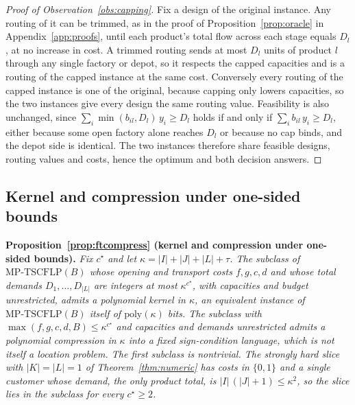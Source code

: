 \begin{proof}[Proof of Observation~\ref{obs:capping}]
Fix a design of
the original instance. Any routing of it can be trimmed, as in
the proof of Proposition~\ref{prop:oracle} in Appendix~\ref{app:proofs}, until each product's total
flow across each stage equals $D_l$, at no increase in cost. A
trimmed routing sends at most $D_l$ units of product $l$ through any
single factory or depot, so it respects the capped capacities and is a
routing of the capped instance at the same cost. Conversely every
routing of the capped instance is one of the original, because capping
only lowers capacities, so the two instances give every design the same
routing value. Feasibility is also unchanged, since
$\sum_i\min(b_{il},D_l)\,y_i\ge D_l$ holds if and only if
$\sum_i b_{il}\,y_i\ge D_l$, either because some open factory alone
reaches $D_l$ or because no cap binds, and the depot side is identical.
The two instances therefore share feasible designs, routing values and
costs, hence the optimum and both decision answers.
\end{proof}

\subsection{Kernel and compression under one-sided bounds}\label{app:ft}

\noindent
\textbf{Proposition~\ref{prop:ftcompress} (kernel and compression
under one-sided bounds).}
\emph{Fix $c^\star$ and let $\kappa=|I|+|J|+|L|+\tau$. The subclass of
$\mathrm{MP\text{-}TSCFLP}(B)$ whose opening and transport costs
$f,g,c,d$ and whose total demands $D_1,\dots,D_{|L|}$ are integers at
most $\kappa^{c^\star}$, with capacities and budget unrestricted,
admits a polynomial kernel in $\kappa$, an equivalent instance of
$\mathrm{MP\text{-}TSCFLP}(B)$ itself of $\mathrm{poly}(\kappa)$
bits. The subclass with $\max(f,g,c,d,B)\le\kappa^{c^\star}$ and
capacities and demands unrestricted admits a
polynomial compression in $\kappa$ into a fixed sign-condition
language, which is not itself a location problem. The first subclass is nontrivial.
The strongly hard slice with $|K|=|L|=1$ of Theorem~\ref{thm:numeric}
has costs in $\{0,1\}$ and a single customer whose demand, the only
product total, is $|I|\,(|J|+1)\le\kappa^{2}$, so the slice lies in the
subclass for every $c^\star\ge 2$.}

